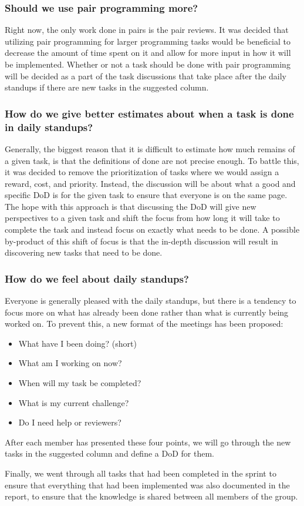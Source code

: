 \subsubsection{Should we use pair programming more?}
Right now, the only work done in pairs is the pair reviews.
It was decided that utilizing pair programming for larger programming tasks would be beneficial to decrease the amount of time spent on it and allow for more input in how it will be implemented.
Whether or not a task should be done with pair programming will be decided as a part of the task discussions that take place after the daily standups if there are new tasks in the suggested column.

\subsubsection{How do we give better estimates about when a task is done in daily standups?}
Generally, the biggest reason that it is difficult to estimate how much remains of a given task, is that the definitions of done are not precise enough.
To battle this, it was decided to remove the prioritization of tasks where we would assign a reward, cost, and priority.
Instead, the discussion will be about what a good and specific DoD is for the given task to ensure that everyone is on the same page.
The hope with this approach is that discussing the DoD will give new perspectives to a given task and shift the focus from how long it will take to complete the task and instead focus on exactly what needs to be done.
A possible by-product of this shift of focus is that the in-depth discussion will result in discovering new tasks that need to be done.\\

\subsubsection{How do we feel about daily standups?}
Everyone is generally pleased with the daily standups, but there is a tendency to focus more on what has already been done rather than what is currently being worked on.
To prevent this, a new format of the meetings has been proposed:

\begin{itemize}
	\item{What have I been doing? (short)}
	\item{What am I working on now?}
	\item{When will my task be completed?}
	\item{What is my current challenge?}
	\item{Do I need help or reviewers?}
\end{itemize}

After each member has presented these four points, we will go through the new tasks in the suggested column and define a DoD for them.

Finally, we went through all tasks that had been completed in the sprint to ensure that everything that had been implemented was also documented in the report, to ensure that the knowledge is shared between all members of the group.

